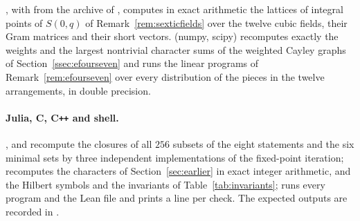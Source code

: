 , with  from the archive of \cite{BMB26}, computes in exact arithmetic the lattices of integral points of $S(0,q)$ of Remark~\ref{rem:sexticfields} over the twelve cubic fields, their Gram matrices and their short vectors.  (numpy, scipy) recomputes exactly the weights and the largest nontrivial character sums of the weighted Cayley graphs of Section~\ref{ssec:efourseven} and runs the linear programs of Remark~\ref{rem:efourseven} over every distribution of the pieces in the twelve arrangements, in double precision.

\paragraph{Julia, C, C\texttt{++} and shell.} ,  and  recompute the closures of all $256$ subsets of the eight statements and the six minimal sets by three independent implementations of the fixed-point iteration;  recomputes the characters of Section~\ref{sec:earlier} in exact integer arithmetic, and  the Hilbert symbols and the invariants of Table~\ref{tab:invariants};  runs every program and the Lean file and prints a line per check. The expected outputs are recorded in .
